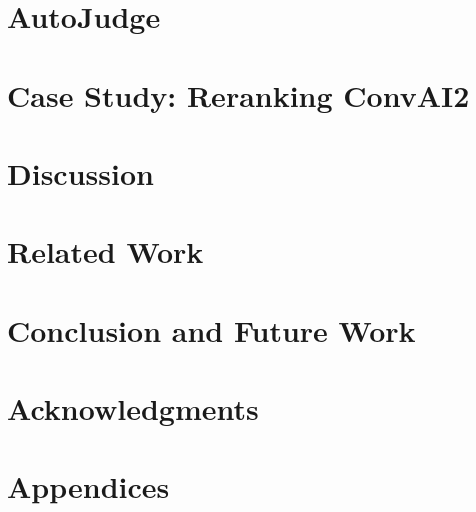 \documentclass[11pt,a4paper]{article}
\begin{document}
 

\section{AutoJudge}

\section{Case Study: Reranking ConvAI2}

\section{Discussion}

\section{Related Work}


\section{Conclusion and Future Work}

\section*{Acknowledgments}




\appendix

\section{Appendices}
\label{sec:appendix}
\end{document}
